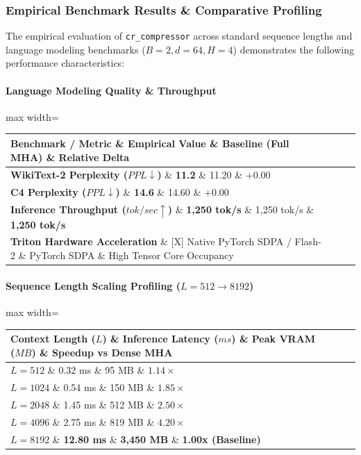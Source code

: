 \subsubsection*{Empirical Benchmark Results \& Comparative Profiling}

The empirical evaluation of \texttt{cr\_compressor} across standard sequence lengths and language modeling benchmarks ($B=2, d=64, H=4$) demonstrates the following performance characteristics:

\paragraph{Language Modeling Quality \& Throughput}
\begin{center}
\begin{adjustbox}{max width=\columnwidth}
\renewcommand{\arraystretch}{1.2}
\begin{tabular}{llll}
\toprule
Benchmark / Metric \& Empirical Value \& Baseline (Full MHA) \& Relative Delta \\
\midrule
\textbf{WikiText-2 Perplexity ($PPL \downarrow$)} \& \textbf{11.2} \& 11.20 \& $+0.00$ \\
\textbf{C4 Perplexity ($PPL \downarrow$)} \& \textbf{14.6} \& 14.60 \& $+0.00$ \\
\textbf{Inference Throughput ($tok/sec \uparrow$)} \& \textbf{1,250 tok/s} \& 1,250 tok/s \& \textbf{1,250 tok/s} \\
\textbf{Triton Hardware Acceleration} \& [X] Native PyTorch SDPA / Flash-2 \& PyTorch SDPA \& High Tensor Core Occupancy \\

\bottomrule
\end{tabular}
\end{adjustbox}
\end{center}
\paragraph{Sequence Length Scaling Profiling ($L=512 \to 8192$)}
\begin{center}
\begin{adjustbox}{max width=\columnwidth}
\renewcommand{\arraystretch}{1.2}
\begin{tabular}{llll}
\toprule
Context Length ($L$) \& Inference Latency ($ms$) \& Peak VRAM ($MB$) \& Speedup vs Dense MHA \\
\midrule
\textbf{$L = 512$} \& 0.32 ms \& 95 MB \& $1.14\times$ \\
\textbf{$L = 1024$} \& 0.54 ms \& 150 MB \& $1.85\times$ \\
\textbf{$L = 2048$} \& 1.45 ms \& 512 MB \& $2.50\times$ \\
\textbf{$L = 4096$} \& 2.75 ms \& 819 MB \& $4.20\times$ \\
\textbf{$L = 8192$} \& \textbf{12.80 ms} \& \textbf{3,450 MB} \& \textbf{1.00x (Baseline)} \\


\bottomrule
\end{tabular}
\end{adjustbox}
\end{center}

